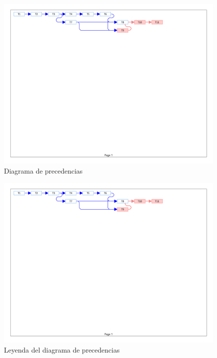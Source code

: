 \begin{figure}[!htbp]
	\centering
	\includegraphics[page=1, scale=.65]{fig/network_diagram_simplified}
	\caption{Diagrama de precedencias}\label{fig:network_diagram}
\end{figure}

\begin{figure}[!htbp]
	\centering
	\includegraphics[page=2, scale=.65]{fig/network_diagram_simplified}
	\caption{Leyenda del diagrama de precedencias}
\end{figure}